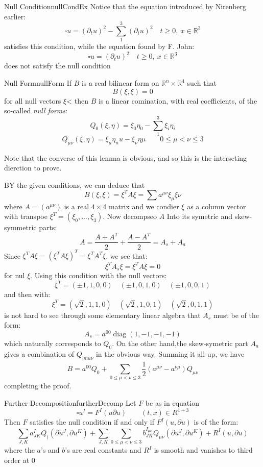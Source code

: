 \documentclass{book}
\newenvironment{Proof}[1][]
  {\begin{ProofTcb}[#1]}
  {\end{ProofTcb}}
\newcommand{\R}{{\mathbb{R}}}
\begin{document}
\begin{example}{Null Condition}{nullCondEx}
	Notice that the equation introduced by Nirenberg earlier:
	\[
		\square u = (  \partial_t u )^2 - \sum_1^3 (  \partial_i u )^2 \quad t \ge 0,\ x \in \R^3
	\]
	satisfies this condition, while the equation found by F. John:
	\[
		\square u = (  \partial_t u )^2 \quad t \ge 0,\  x \in \R^3
	\]
	does not satisfy the null condition
\end{example}

\begin{lem}{Null Form}{nullForm}
	If $B$ is a real bilinear form on $\R^n\times \R^4$ such that
	\[
		B(\xi, \xi) = 0
	\]
	for all null vectors $\xi$< then $B$ is a linear comination, with real coefficients, of the so-called \emph{null
	forms}:
	\[
		Q_0(\xi,\eta) = \xi_0\eta_0 - \sum_1^3\xi_i\eta_i
	\]
	\[
		Q_{\mu\nu}(\xi, \eta) = \xi_\mu\eta_nu - \xi_\nu\eta\mu \qquad 0 \le \mu<\nu\le 3
	\]
\end{lem}

Note that the converse of this lemma is obvious, and so this is the interseting dierction to prove.

\begin{Proof}
	BY the given conditions, we can deduce that
	\[
		B(\xi,\xi) = \xi^TA\xi = \sum a^{\mu\nu}\xi_\mu\xi\nu
	\]
	where $A = (a^{\mu\nu})$ is a real $4\times 4$ matrix and we condier $\xi$ as a column vector with transpoe
	$\xi^T = (\xi_0, ..., \xi_3)$. Now decompseo $A$ Into its symetric and skew-symmetric parts:
	\[
		A = \frac{A + A^T}{2} + \frac{A - A^T}{2} = A_s + A_a
	\]
	Since $\xi^TA\xi = (\xi^TA\xi)^T = \xi^TA^T\xi$, we see that:
	\[
		\xi^TA_s\xi = \xi^TA\xi = 0
	\]
	for nul $\xi$. Using this condition with the null vectors:
	\[
		\xi^T = (\pm 1, 1, 0, 0) \quad (\pm 1, 0, 1, 0) \quad (\pm 1, 0, 0, 1)
	\]
	and then with:
	\[
		\xi^T = (\sqrt{2}, 1, 1, 0) \quad (\sqrt{2}, 1, 0, 1)\quad (\sqrt{2}, 0, 1, 1)
	\]
	is not hard to see through some elementary linear algebra that $A_s$ must be of the form:
	\[
		A_s = a^{00}\operatorname{diag}(1, -1, -1, -1)
	\]
	which naturally corresponds to $Q_0$. On the other hand,the skew-symetric part $A_a$ gives a combination of
	$Q_{|mu\nu}$ in the obvious way. Summing it all up, we have
	\[
		B = a^{00}Q_0 + \sum_{0 \le \mu<\nu\le 3} \frac{1}{2} (a^{\mu\nu} - a^{\nu\mu})Q_{\mu\nu}
	\]
	completing the proof.
\end{Proof}


\begin{cor}{Further Decomposition}{furtherDecomp}
	Let $F$ be as in equation
	\[
		\square u^I = F^I(u  \partial u) \qquad (t,x) \in R^{1+3}
	\]
	Then $F$ satisfies the null condition if and only if $F^I(u,  \partial u)$ is of the form:
	\[
		\sum_{J, K}a^I_{JK}Q_)(  \partial u^J,  \partial u^K ) + \sum_{J, K} \sum_{0 \le \mu < \nu \le 3}
		b_{JK}^{I_{\mu\nu}} Q_{\mu\nu}(  \partial u^J,  \partial u^K ) + R^I(u,  \partial u)
	\]
	where the $a$'s and $b$'s are real constants and $R^I$ is smooth and vanishes to third order at $0$
\end{cor}
\end{document}
